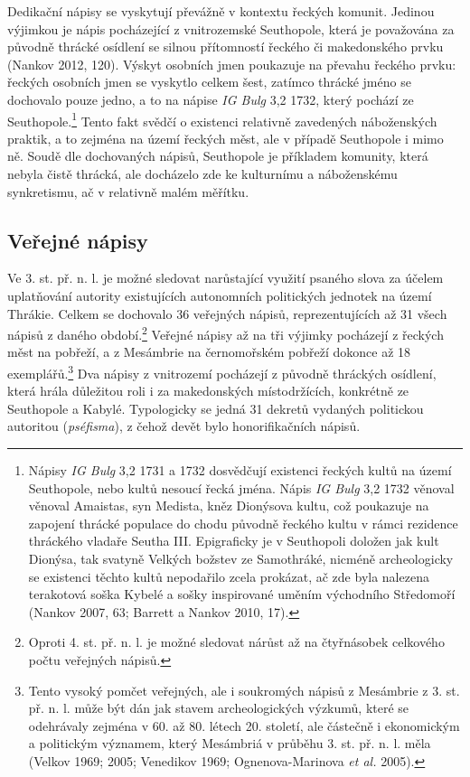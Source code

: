 Dedikační nápisy se vyskytují převážně v kontextu řeckých komunit. Jedinou výjimkou je nápis pocházející z vnitrozemské Seuthopole, která je považována za původně thrácké osídlení se silnou přítomností řeckého či makedonského prvku (Nankov 2012, 120). Výskyt osobních jmen poukazuje na převahu řeckého prvku: řeckých osobních jmen se vyskytlo celkem šest, zatímco thrácké jméno se dochovalo pouze jedno, a to na nápise {\em IG Bulg} 3,2 1732, který pochází ze Seuthopole.\footnote{Nápisy {\em IG Bulg} 3,2 1731 a 1732 dosvědčují existenci řeckých kultů na území Seuthopole, nebo kultů nesoucí řecká jména. Nápis {\em IG Bulg} 3,2 1732 věnoval věnoval Amaistas, syn Medista, kněz Dionýsova kultu, což poukazuje na zapojení thrácké populace do chodu původně řeckého kultu v rámci rezidence thráckého vladaře Seutha III. Epigraficky je v Seuthopoli doložen jak kult Dionýsa, tak svatyně Velkých božstev ze Samothráké, nicméně archeologicky se existenci těchto kultů nepodařilo zcela prokázat, ač zde byla nalezena terakotová soška Kybelé a sošky inspirované uměním východního Středomoří (Nankov 2007, 63; Barrett a Nankov 2010, 17).} Tento fakt svědčí o existenci relativně zavedených náboženských praktik, a to zejména na území řeckých měst, ale v případě Seuthopole i mimo ně. Soudě dle dochovaných nápisů, Seuthopole je příkladem komunity, která nebyla čistě thrácká, ale docházelo zde ke kulturnímu a náboženskému synkretismu, ač v relativně malém měřítku.

\subsection[veřejné-nápisy-5]{Veřejné nápisy}

Ve 3. st. př. n. l. je možné sledovat narůstající využití psaného slova za účelem uplatňování autority existujících autonomních politických jednotek na území Thrákie. Celkem se dochovalo 36 veřejných nápisů, reprezentujících až 31  všech nápisů z daného období.\footnote{Oproti 4. st. př. n. l. je možné sledovat nárůst až na čtyřnásobek celkového počtu veřejných nápisů.} Veřejné nápisy až na tři výjimky pocházejí z řeckých měst na pobřeží, a z Mesámbrie na černomořském pobřeží dokonce až 18 exemplářů.\footnote{Tento vysoký pomčet veřejných, ale i soukromých nápisů z Mesámbrie z 3. st. př. n. l. může být dán jak stavem archeologických výzkumů, které se odehrávaly zejména v 60. až 80. létech 20. století, ale částečně i ekonomickým a politickým významem, který Mesámbriá v průběhu 3. st. př. n. l. měla (Velkov 1969; 2005; Venedikov 1969; Ognenova-Marinova {\em et al.} 2005).} Dva nápisy z vnitrozemí pocházejí z původně thráckých osídlení, která hrála důležitou roli i za makedonských místodržících, konkrétně ze Seuthopole a Kabylé. Typologicky se jedná 31 dekretů vydaných politickou autoritou ({\em pséfisma}), z čehož devět bylo honorifikačních nápisů.

